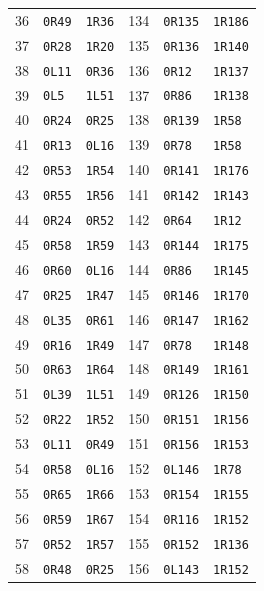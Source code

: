\begin{longtable}{rll@{\qquad}rll}
36 & \texttt{0R49} & \texttt{1R36} & 134 & \texttt{0R135} & \texttt{1R186}\\
37 & \texttt{0R28} & \texttt{1R20} & 135 & \texttt{0R136} & \texttt{1R140}\\
38 & \texttt{0L11} & \texttt{0R36} & 136 & \texttt{0R12} & \texttt{1R137}\\
39 & \texttt{0L5} & \texttt{1L51} & 137 & \texttt{0R86} & \texttt{1R138}\\
40 & \texttt{0R24} & \texttt{0R25} & 138 & \texttt{0R139} & \texttt{1R58}\\
41 & \texttt{0R13} & \texttt{0L16} & 139 & \texttt{0R78} & \texttt{1R58}\\
42 & \texttt{0R53} & \texttt{1R54} & 140 & \texttt{0R141} & \texttt{1R176}\\
43 & \texttt{0R55} & \texttt{1R56} & 141 & \texttt{0R142} & \texttt{1R143}\\
44 & \texttt{0R24} & \texttt{0R52} & 142 & \texttt{0R64} & \texttt{1R12}\\
45 & \texttt{0R58} & \texttt{1R59} & 143 & \texttt{0R144} & \texttt{1R175}\\
46 & \texttt{0R60} & \texttt{0L16} & 144 & \texttt{0R86} & \texttt{1R145}\\
47 & \texttt{0R25} & \texttt{1R47} & 145 & \texttt{0R146} & \texttt{1R170}\\
48 & \texttt{0L35} & \texttt{0R61} & 146 & \texttt{0R147} & \texttt{1R162}\\
49 & \texttt{0R16} & \texttt{1R49} & 147 & \texttt{0R78} & \texttt{1R148}\\
50 & \texttt{0R63} & \texttt{1R64} & 148 & \texttt{0R149} & \texttt{1R161}\\
51 & \texttt{0L39} & \texttt{1L51} & 149 & \texttt{0R126} & \texttt{1R150}\\
52 & \texttt{0R22} & \texttt{1R52} & 150 & \texttt{0R151} & \texttt{1R156}\\
53 & \texttt{0L11} & \texttt{0R49} & 151 & \texttt{0R156} & \texttt{1R153}\\
54 & \texttt{0R58} & \texttt{0L16} & 152 & \texttt{0L146} & \texttt{1R78}\\
55 & \texttt{0R65} & \texttt{1R66} & 153 & \texttt{0R154} & \texttt{1R155}\\
56 & \texttt{0R59} & \texttt{1R67} & 154 & \texttt{0R116} & \texttt{1R152}\\
57 & \texttt{0R52} & \texttt{1R57} & 155 & \texttt{0R152} & \texttt{1R136}\\
58 & \texttt{0R48} & \texttt{0R25} & 156 & \texttt{0L143} & \texttt{1R152}\\

\end{longtable}
